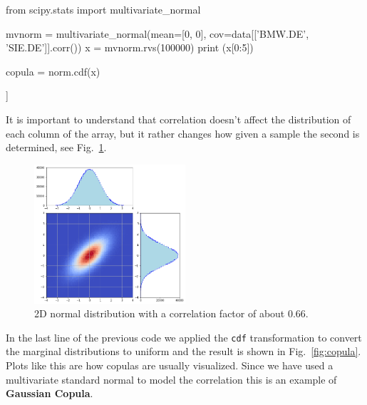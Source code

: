 
\begin{ipython}
from scipy.stats import multivariate_normal

mvnorm = multivariate_normal(mean=[0, 0], cov=data[['BMW.DE', 'SIE.DE']].corr())
x = mvnorm.rvs(100000)
print (x[0:5])

copula = norm.cdf(x)
\end{ipython}
\begin{ioutput}
[[-0.03120891 -0.24918657]
 [-0.17677523 -1.01992715]
 [-0.60572525  0.95517049]
 [-0.79814057  0.69339518]
 [ 0.11990304  0.0947739 ]]
\end{ioutput}

It is important to understand that correlation doesn't affect the distribution of each column of the array, but it rather changes how given a sample the second is determined, see Fig.~\ref{fig:multivariate_with_correlation}.

\begin{figure}[htbp]
\centering
\includegraphics[width=0.5\textwidth]{figures/multivariate_2d_corr_bmw_sie}
\caption{2D normal distribution with a correlation factor of about 0.66.}
\label{fig:multivariate_with_correlation}
\end{figure}
    
In the last line of the previous code we applied the \texttt{cdf} transformation to convert the marginal distributions to uniform and 
the result is shown in Fig.~\ref{fig:copula}. Plots like this are how copulas are usually visualized. Since we have used a multivariate standard normal to model the correlation this is an example of \textbf{Gaussian Copula}.

